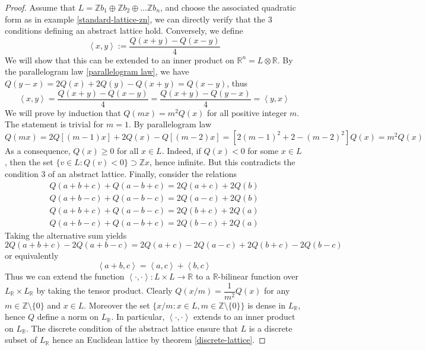 \begin{proof}
    Assume that $L=\mathbb{Z}b_1\oplus \mathbb{Z}b_2\oplus \ldots \mathbb{Z}b_n$, and choose the associated quadratic form as in example \ref{standard-lattice-zn}, we can directly
    verify that the 3 conditions defining an abstract lattice hold. Conversely, we define
    \[\left\langle x,y\right\rangle:=\dfrac{Q(x+y)-Q(x-y)}{4}\]
    We will show that this can be extended to an inner product on $\mathbb{R}^n = L \otimes \mathbb{R}$. By the parallelogram law \ref{parallelogram law}, we have $Q(y-x) = 2Q(x)+2Q(y)-Q(x+y) = Q(x-y)$, thus
    \[\left\langle x,y \right\rangle=\dfrac{Q(x+y)-Q(x-y)}{4} = \dfrac{Q(x+y)-Q(y-x)}{4} = \left\langle y,x \right\rangle\]
    We will prove by induction that $Q(mx) = m^2Q(x)$ for all positive integer $m$. The statement is trivial for $m=1$. By parallelogram law
    \[Q(mx) = 2Q[(m-1)x] + 2Q(x) - Q[(m-2)x] = [2(m-1)^2+2-(m-2)^2]Q(x) = m^2Q(x)\]
    As a consequence, $Q(x) \ge 0$ for all $x \in L$. Indeed, if $Q(x)<0$ for some $x \in L$, then the set $\{v \in L: Q(v)<0\}\supset \mathbb{Z}x$, hence infinite. But this contradicts
    the condition 3 of an abstract lattice. Finally, consider the relations
    \begin{align*}
        Q(a+b+c) +Q(a-b+c) = 2Q(a+c)+2Q(b) \\
        Q(a+b-c)+ Q(a-b-c) = 2Q(a-c)+2Q(b) \\
        Q(a+b+c)+ Q(a-b-c) =2Q(b+c)+2Q(a)  \\
        Q(a+b-c)+ Q(a-b+c) =2Q(b-c)+2Q(a)
    \end{align*}
    Taking the alternative sum yields
    \[2Q(a+b+c)-2Q(a+b-c) = 2Q(a+c)-2Q(a-c) + 2Q(b+c)-2Q(b-c) \]
    or equivalently
    \[\left\langle a+b,c\right\rangle = \left\langle a,c\right\rangle+ \left\langle b,c\right\rangle \]
    Thus we can extend  the function $\left\langle \cdot,\cdot \right\rangle \colon L \times L\to \mathbb{R}$ to a $\mathbb{R}$-bilinear function over $L_\mathbb{R} \times L_\mathbb{R}$ by
    taking the tensor product. Clearly $Q(x/m) = \dfrac{1}{m^2}Q(x)$ for any $m \in \mathbb{Z} \setminus \{0\}$ and $x\in L$. Moreover the set $\{x/m: x \in L, m \in \mathbb{Z} \setminus \{0\}\}$ is dense
    in $L_\mathbb{R}$, hence $Q$ define a norm on $L_\mathbb{R}$. In particular, $\left\langle \cdot, \cdot\right\rangle$ extends to an inner product on $L_\mathbb{R}$. The discrete condition of the abstract lattice ensure that
    $L$ is a discrete subset of $L_\mathbb{R}$ hence an Euclidean lattice by theorem \ref{discrete-lattice}.
\end{proof}

